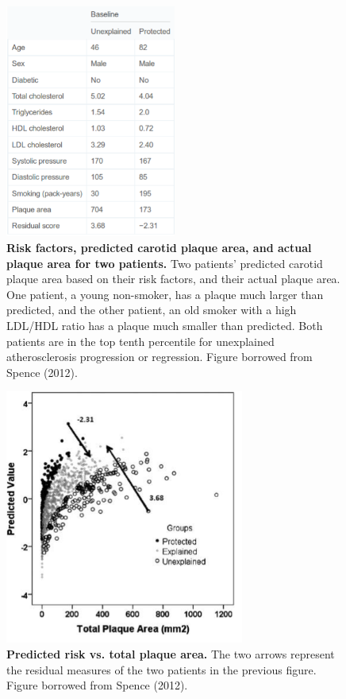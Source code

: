 \begin{figure}[h]
\begin{center}
\includegraphics[width=0.5\textwidth]{risk_factors.png}
\caption{\textbf{Risk factors, predicted carotid plaque area, and actual plaque area for two patients.} Two patients’ predicted carotid plaque area based on their risk factors, and their actual plaque area. One patient, a young non-smoker, has a plaque much larger than predicted, and the other patient, an old smoker with a high LDL/HDL ratio has a plaque much smaller than predicted. Both patients are in the top tenth percentile for unexplained atherosclerosis progression or regression. Figure borrowed from Spence (2012).}
\end{center}
\end{figure}

\begin{figure}[h]
\begin{center}
\includegraphics[width=0.7\textwidth]{risk_vs_plaque.png}
\caption{\textbf{Predicted risk vs. total plaque area.} The two arrows represent the residual measures of the two patients in the previous figure. Figure borrowed from Spence (2012).}
\end{center}
\end{figure}

